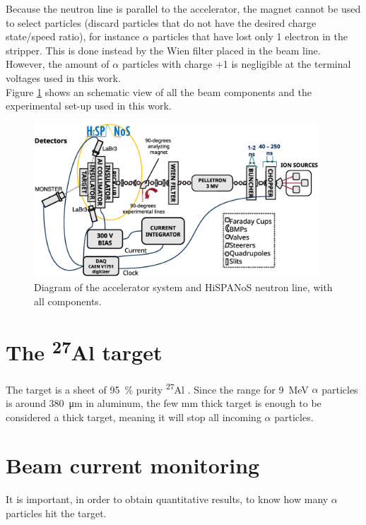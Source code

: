 \documentclass[a4paper,12pt]{report}
\newcommand{\Aliso}{\textsuperscript{27}Al }
\begin{document}
Because the neutron line is parallel to the accelerator, the magnet cannot be used to select particles (discard particles that do not have the desired charge state/speed ratio), for instance $\alpha$ particles that have lost only 1 electron in the stripper.
This is done instead by the Wien filter placed in the beam line.
However, the amount of $\alpha$ particles with charge +1 is negligible at the terminal voltages used in this work.
\\

Figure \ref{tandemdiagrama} shows an schematic view of all the beam components and the experimental set-up used in this work.

\begin{figure}[H]
	\centering
	\includegraphics[width=0.95\textwidth]{tandemdiagrama.eps}
	\caption{Diagram of the accelerator system and HiSPANoS neutron line, with all components.}
	\label{tandemdiagrama}
\end{figure}

\section{The \Aliso target}
The target is a sheet of \qty{95}{\percent} purity \Aliso.
Since the range for 9~MeV $\alpha$ particles is around \qty{380}{\micro\m} in aluminum, the few \unit{\milli\m} thick target is enough to be considered a thick target, meaning it will stop all incoming $\alpha$ particles.
\\

\section{Beam current monitoring}
It is important, in order to obtain quantitative results, to know how many $\alpha$ particles hit the target.
\end{document}
